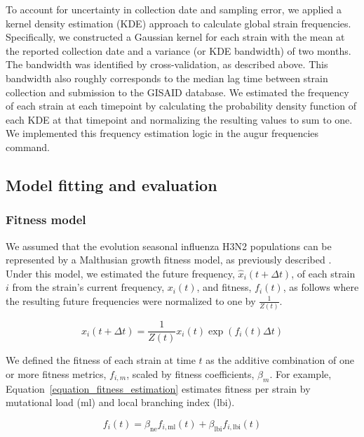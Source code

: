 \documentclass[9pt,lineno]{elife} %
\providecommand{\DIFaddbegin}{} %
\providecommand{\DIFaddend}{} %
\providecommand{\DIFdelbegin}{} %
\providecommand{\DIFdelend}{} %
\providecommand{\DIFaddbegin}{} %
\providecommand{\DIFaddend}{} %
\providecommand{\DIFdelbegin}{} %
\providecommand{\DIFdelend}{} %
\newcommand{\DIFscaledelfig}{0.5}
\newlength{\DIFdelgraphicswidth} %
\newlength{\DIFdelgraphicsheight} %
\newcommand{\DIFaddincludegraphics}[2][]{{\color{blue}\fbox{\DIFOincludegraphics[#1]{#2}}}} %
\newcommand{\DIFdelincludegraphics}[2][]{%
\sbox{\DIFdelgraphicsbox}{\DIFOincludegraphics[#1]{#2}}%
\settoboxwidth{\DIFdelgraphicswidth}{\DIFdelgraphicsbox} %
\settoboxtotalheight{\DIFdelgraphicsheight}{\DIFdelgraphicsbox} %
\scalebox{\DIFscaledelfig}{%
\parbox[b]{\DIFdelgraphicswidth}{\usebox{\DIFdelgraphicsbox}\\[-\baselineskip] \rule{\DIFdelgraphicswidth}{0em}}\llap{\resizebox{\DIFdelgraphicswidth}{\DIFdelgraphicsheight}{%
\setlength{\unitlength}{\DIFdelgraphicswidth}%
\begin{picture}(1,1)%
\thicklines\linethickness{2pt} %
{\color[rgb]{1,0,0}\put(0,0){\framebox(1,1){}}}%
{\color[rgb]{1,0,0}\put(0,0){\line( 1,1){1}}}%
{\color[rgb]{1,0,0}\put(0,1){\line(1,-1){1}}}%
\end{picture}%
}\hspace*{3pt}}} %
} %
\DeclareRobustCommand{\DIFaddbegin}{\DIFOaddbegin \let\includegraphics\DIFaddincludegraphics} %
\DeclareRobustCommand{\DIFaddend}{\DIFOaddend \let\includegraphics\DIFOincludegraphics} %
\DeclareRobustCommand{\DIFdelbegin}{\DIFOdelbegin \let\includegraphics\DIFdelincludegraphics} %
\DeclareRobustCommand{\DIFdelend}{\DIFOaddend \let\includegraphics\DIFOincludegraphics} %
\begin{document}
To account for uncertainty in collection date and sampling error, we applied a kernel density estimation (KDE) approach to calculate global strain frequencies.
Specifically, we constructed a Gaussian kernel for each strain with the mean at the reported collection date and a variance (or KDE bandwidth) of two months.
The bandwidth was identified by cross-validation, as described above.
This bandwidth also roughly corresponds to the median lag time between strain collection and submission to the GISAID database.
We estimated the frequency of each strain at each timepoint by calculating the probability density function of each KDE at that timepoint and normalizing the resulting values to sum to one.
We implemented this frequency estimation logic in the augur frequencies command.

\subsection*{Model fitting and evaluation}

\subsubsection*{Fitness model}

We assumed that the evolution seasonal influenza H3N2 populations can be represented by a Malthusian growth fitness model, as previously described \DIFdelbegin %
\DIFdelend \DIFaddbegin \citep{Luksza:2014hj}\DIFaddend .
Under this model, we estimated the future frequency, $\hat{x}_{i}(t + \Delta{t})$, of each strain $i$ from the strain's current frequency, $x_{i}(t)$, and fitness, $f_{i}(t)$, as follows where the resulting future frequencies were normalized to one by $\frac{1}{Z(t)}$.

\begin{equation}
    \hat{x}_{i}(t + \Delta{t}) = \frac{1}{Z(t)}x_{i}(t)\exp(f_{i}(t)\Delta{t})
    \label{equation_exponential_growth_model}
\end{equation}

We defined the fitness of each strain at time $t$ as the additive combination of one or more fitness metrics, $f_{i,m}$, scaled by fitness coefficients, $\beta_{m}$.
For example, Equation~\ref{equation_fitness_estimation} estimates fitness per strain by mutational load ($\mathrm{ml}$) and local branching index ($\mathrm{lbi}$).

\begin{equation}
    f_{i}(t) = \beta_{\mathrm{ne}}f_{i, \mathrm{ml}}(t) + \beta_{\mathrm{lbi}}f_{i, \mathrm{lbi}}(t)
    \label{equation_fitness_estimation}
\end{equation}
\end{document}
